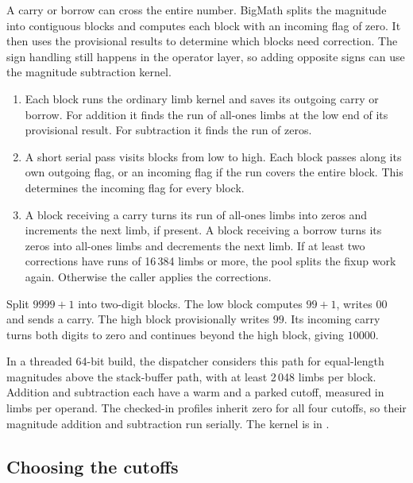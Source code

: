 A carry or borrow can cross the entire number. BigMath splits the magnitude into
contiguous blocks and computes each block with an incoming flag of zero. It then
uses the provisional results to determine which blocks need correction. The sign
handling still happens in the operator layer, so adding opposite signs can use
the magnitude subtraction kernel.

\begin{enumerate}
  \item Each block runs the ordinary limb kernel and saves its outgoing carry
        or borrow. For addition it finds the run of all-ones limbs at the low end
        of its provisional result. For subtraction it finds the run of zeros.
  \item A short serial pass visits blocks from low to high. Each block passes
        along its own outgoing flag, or an incoming flag if the run covers the
        entire block. This determines the incoming flag for every block.
  \item A block receiving a carry turns its run of all-ones limbs into zeros
        and increments the next limb, if present. A block receiving a borrow
        turns its zeros into all-ones limbs and decrements the next limb. If at
        least two corrections have runs of 16\,384 limbs or more, the pool
        splits the fixup work again. Otherwise the caller applies the corrections.
\end{enumerate}

\begin{example}
Split $9999 + 1$ into two-digit blocks. The low block computes $99+1$, writes
$00$ and sends a carry. The high block provisionally writes $99$. Its incoming
carry turns both digits to zero and continues beyond the high block, giving $10000$.
\end{example}

In a threaded 64-bit build, the dispatcher considers this path for equal-length
magnitudes above the stack-buffer path, with at least 2\,048 limbs per block.
Addition and subtraction each have a warm and a parked cutoff, measured in
limbs per operand. The checked-in profiles inherit zero for all four cutoffs,
so their magnitude addition and subtraction run serially. The kernel is in
.

\subsection*{Choosing the cutoffs}

